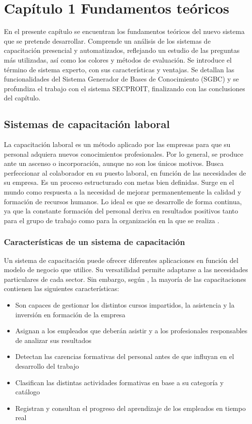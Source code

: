 \chapter*{Capítulo 1 \vspace{0.5cm} \break Fundamentos teóricos}
\setcounter{chapter}{1}

En el presente capítulo se encuentran los fundamentos teóricos del nuevo sistema que se pretende desarrollar. Comprende un análisis de los sistemas de capacitación presencial y automatizados, reflejando un estudio de las preguntas más utilizadas, así como los colores y métodos de evaluación. Se introduce el término de sistema experto, con sus características y ventajas. Se detallan las funcionalidades del Sistema Generador de Bases de Conocimiento (SGBC) y se profundiza el trabajo con el sistema SECPROIT, finalizando con las conclusiones del capítulo.

\section{Sistemas de capacitación laboral}
La capacitación laboral es un método aplicado por las empresas para que su personal adquiera nuevos conocimientos profesionales. Por lo general, se produce ante un ascenso o incorporación, aunque no son los únicos motivos. Busca perfeccionar al colaborador en su puesto laboral, en función de las necesidades de su empresa. Es un proceso estructurado con metas bien definidas. Surge en el mundo como respuesta a la necesidad de mejorar permanentemente la calidad y formación de recursos humanos. Lo ideal es que se desarrolle de forma continua, ya que la constante formación del personal deriva en resultados positivos tanto para el grupo de trabajo como para la organización en la que se realiza \cite{Denby2010}.

\subsection{Características de un sistema de capacitación}
Un sistema de capacitación puede ofrecer diferentes aplicaciones en función del modelo de negocio que utilice. Su versatilidad permite adaptarse a las necesidades particulares de cada sector. Sin embargo, según \cite{Paez2022}, la mayoría de las capacitaciones contienen las siguientes características:

\begin{itemize}
\item Son capaces de gestionar los distintos cursos impartidos, la asistencia y la inversión en formación de la empresa
\item Asignan a los empleados que deberán asistir y a los profesionales responsables de analizar sus resultados
\item Detectan las carencias formativas del personal antes de que influyan en el desarrollo del trabajo
\item Clasifican las distintas actividades formativas en base a su categoría y catálogo
\item Registran y consultan el progreso del aprendizaje de los empleados en tiempo real
\end{itemize}

